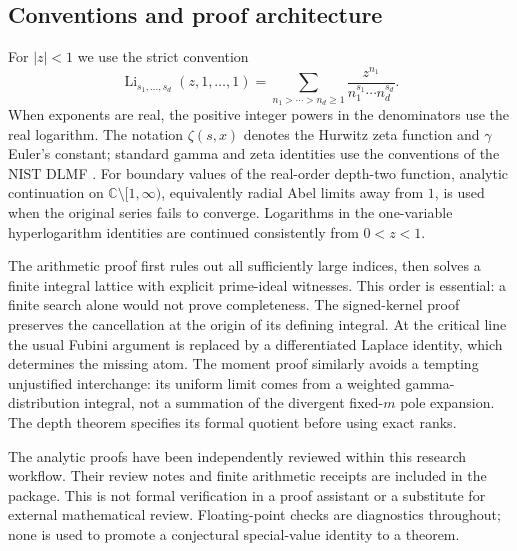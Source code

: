 \documentclass[11pt,letterpaper]{article}
\DeclareMathOperator{\Li}{Li}
\theoremstyle{definition}
\theoremstyle{remark}
\numberwithin{equation}{section}
\begin{document}
\subsection{Conventions and proof architecture}
For \(|z|<1\) we use the strict convention
\[
 \Li_{s_1,\ldots,s_d}(z,1,\ldots,1)
 =\sum_{n_1>\cdots>n_d\ge1}
       \frac{z^{n_1}}{n_1^{s_1}\cdots n_d^{s_d}}.
\]
When exponents are real, the positive integer powers in the denominators
use the real logarithm. The notation \(\zeta(s,x)\) denotes the Hurwitz
zeta function and \(\gamma\) Euler's constant; standard gamma and zeta
identities use the conventions of the NIST DLMF \cite{DLMF}.
For boundary values of the real-order depth-two function, analytic
continuation on \(\mathbb C\setminus[1,\infty)\), equivalently radial
Abel limits away from \(1\), is used when the original series fails
to converge. Logarithms in the one-variable hyperlogarithm identities
are continued consistently from \(0<z<1\).

The arithmetic proof first rules out all sufficiently large indices,
then solves a finite integral lattice with explicit prime-ideal
witnesses. This order is essential: a finite search alone would not
prove completeness. The signed-kernel proof preserves the cancellation
at the origin of its defining integral. At the critical line the
usual Fubini argument is replaced by a differentiated Laplace identity,
which determines the missing atom. The moment proof similarly avoids
a tempting unjustified interchange: its uniform limit comes from a
weighted gamma-distribution integral, not a summation of the divergent
fixed-\(m\) pole expansion. The depth theorem specifies its formal
quotient before using exact ranks.

The analytic proofs have been independently reviewed within this
research workflow. Their review notes and finite arithmetic receipts
are included in the package. This is not formal verification in a
proof assistant or a substitute for external mathematical review.
Floating-point checks are diagnostics throughout; none is used to
promote a conjectural special-value identity to a theorem.



\FloatBarrier

\FloatBarrier

\FloatBarrier



\end{document}
